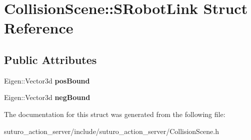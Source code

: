 \hypertarget{structCollisionScene_1_1SRobotLink}{\section{Collision\-Scene\-:\-:S\-Robot\-Link Struct Reference}
\label{structCollisionScene_1_1SRobotLink}
}
\subsection*{Public Attributes}
\begin{DoxyCompactItemize}
\item 
\hypertarget{structCollisionScene_1_1SRobotLink_ac4a672b5063c7f9fb0b28b0d25feafa8}{Eigen\-::\-Vector3d {\bfseries pos\-Bound}}\label{structCollisionScene_1_1SRobotLink_ac4a672b5063c7f9fb0b28b0d25feafa8}

\item 
\hypertarget{structCollisionScene_1_1SRobotLink_a302245e6caa88a6d1a8dec7a15a047e1}{Eigen\-::\-Vector3d {\bfseries neg\-Bound}}\label{structCollisionScene_1_1SRobotLink_a302245e6caa88a6d1a8dec7a15a047e1}

\end{DoxyCompactItemize}


The documentation for this struct was generated from the following file\-:\begin{DoxyCompactItemize}
\item 
suturo\-\_\-action\-\_\-server/include/suturo\-\_\-action\-\_\-server/Collision\-Scene.\-h\end{DoxyCompactItemize}
